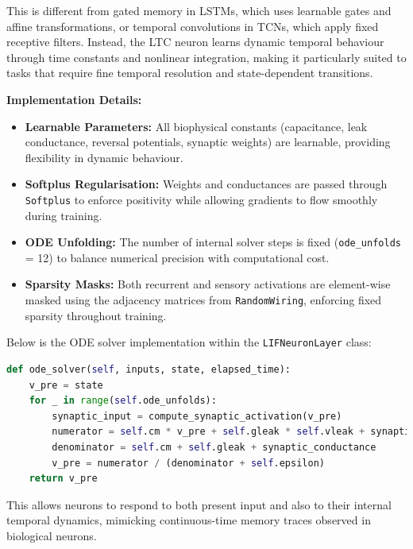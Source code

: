 This is different from gated memory in LSTMs, which uses learnable gates and affine transformations, or temporal convolutions in TCNs, which apply fixed receptive filters. Instead, the LTC neuron learns dynamic temporal behaviour through time constants and nonlinear integration, making it particularly suited to tasks that require fine temporal resolution and state-dependent transitions.

\vspace{1em}
\noindent \textbf{Implementation Details:}
\begin{itemize}
    \item \textbf{Learnable Parameters:} All biophysical constants (capacitance, leak conductance, reversal potentials, synaptic weights) are learnable, providing flexibility in dynamic behaviour.
    \item \textbf{Softplus Regularisation:} Weights and conductances are passed through \texttt{Softplus} to enforce positivity while allowing gradients to flow smoothly during training.
    \item \textbf{ODE Unfolding:} The number of internal solver steps is fixed (\texttt{ode\_unfolds} = 12) to balance numerical precision with computational cost.
    \item \textbf{Sparsity Masks:} Both recurrent and sensory activations are element-wise masked using the adjacency matrices from \texttt{RandomWiring}, enforcing fixed sparsity throughout training.
\end{itemize}

\noindent Below is the ODE solver implementation within the \texttt{LIFNeuronLayer} class:
\begin{lstlisting}[language=Python, caption={Simplified LTC neuron forward method}]
def ode_solver(self, inputs, state, elapsed_time):
    v_pre = state
    for _ in range(self.ode_unfolds):
        synaptic_input = compute_synaptic_activation(v_pre)
        numerator = self.cm * v_pre + self.gleak * self.vleak + synaptic_input
        denominator = self.cm + self.gleak + synaptic_conductance
        v_pre = numerator / (denominator + self.epsilon)
    return v_pre
\end{lstlisting}
This allows neurons to respond to both present input and also to their internal temporal dynamics, mimicking continuous-time memory traces observed in biological neurons.

